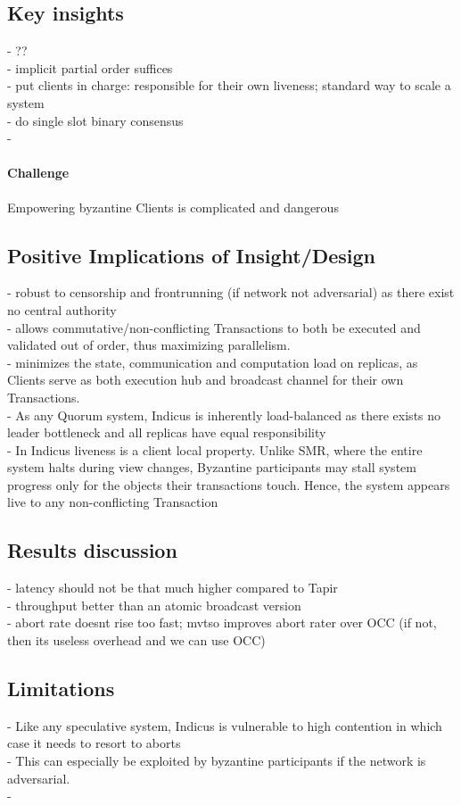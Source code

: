 \subsection{Key insights}
- ?? \\
- implicit partial order suffices \\
- put clients in charge: responsible for their own liveness;  standard way to scale a system\\
- do single slot binary consensus\\
-
\paragraph{Challenge} Empowering byzantine Clients is complicated and dangerous

\subsection{Positive Implications of Insight/Design}
- robust to censorship and frontrunning (if network not adversarial) as there exist no central authority \\
-  allows commutative/non-conflicting Transactions to both be executed and validated out of order, thus maximizing parallelism. \\
-  minimizes the state, communication and computation load on replicas, as Clients serve as both execution hub and broadcast channel for their own Transactions. \\
- As any Quorum system, Indicus is inherently load-balanced as there exists no leader bottleneck and all replicas have equal responsibility\\
- In Indicus liveness is a client local property. Unlike SMR, where the entire system halts during view changes, Byzantine participants may stall system progress only for the objects their transactions touch. Hence, the system appears live to any non-conflicting Transaction


\subsection{Results discussion}
- latency should not be that much higher compared to Tapir\\
- throughput better than an atomic broadcast version\\
- abort rate doesnt rise too fast; mvtso improves abort rater over OCC (if not, then its useless overhead and we can use OCC)


\subsection{Limitations}
 - Like any speculative system, Indicus is vulnerable to high contention in which case it needs to resort to aborts\\
 - This can especially be exploited by byzantine participants if the network is adversarial.\\
 - 

